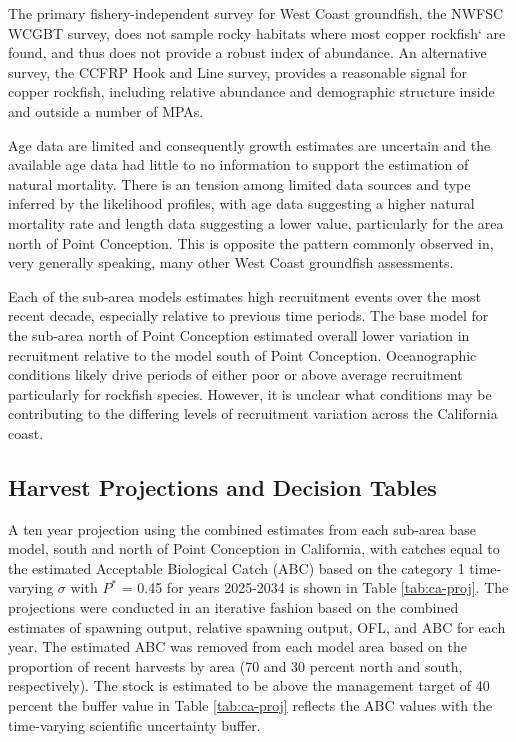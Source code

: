 \documentclass[11pt,
  english,
  letterpaper,
]{article}
\begin{document}
The primary fishery-independent survey for West Coast groundfish, the NWFSC WCGBT survey, does not sample rocky habitats where most copper rockfish` are found, and thus does not provide a robust index of abundance. An alternative survey, the CCFRP Hook and Line survey, provides a reasonable signal for copper rockfish, including relative abundance and demographic structure inside and outside a number of MPAs.

Age data are limited and consequently growth estimates are uncertain and the available age data had little to no information to support the estimation of natural mortality. There is an tension among limited data sources and type inferred by the likelihood profiles, with age data suggesting a higher natural mortality rate and length data suggesting a lower value, particularly for the area north of Point Conception. This is opposite the pattern commonly observed in, very generally speaking, many other West Coast groundfish assessments.

Each of the sub-area models estimates high recruitment events over the most recent decade, especially relative to previous time periods. The base model for the sub-area north of Point Conception estimated overall lower variation in recruitment relative to the model south of Point Conception. Oceanographic conditions likely drive periods of either poor or above average recruitment particularly for rockfish species. However, it is unclear what conditions may be contributing to the differing levels of recruitment variation across the California coast.

\hypertarget{harvest-projections-and-decision-tables}{%
\subsection{Harvest Projections and Decision Tables}\label{harvest-projections-and-decision-tables}}

A ten year projection using the combined estimates from each sub-area base model, south and north of Point Conception in California, with catches equal to the estimated Acceptable Biological Catch (ABC) based on the category 1 time-varying \(\sigma\) with \(P^*\) = 0.45 for years 2025-2034 is shown in Table \ref{tab:ca-proj}. The projections were conducted in an iterative fashion based on the combined estimates of spawning output, relative spawning output, OFL, and ABC for each year. The estimated ABC was removed from each model area based on the proportion of recent harvests by area (70 and 30 percent north and south, respectively). The stock is estimated to be above the management target of 40 percent the buffer value in Table \ref{tab:ca-proj} reflects the ABC values with the time-varying scientific uncertainty buffer.
\end{document}
